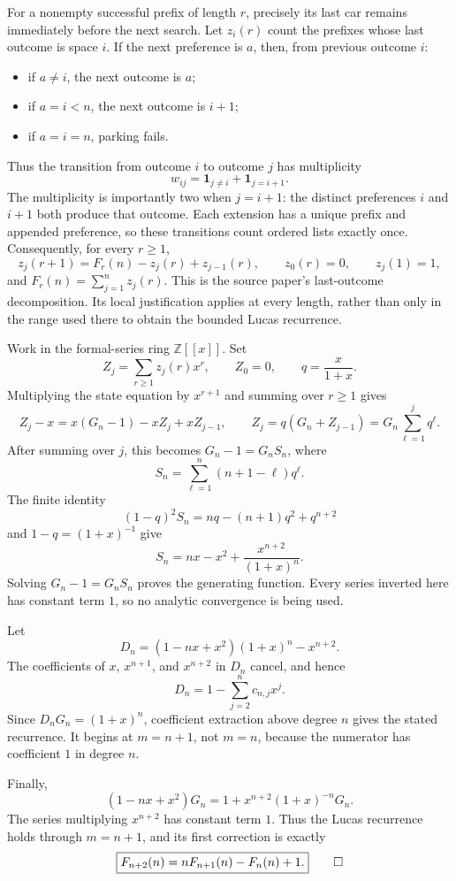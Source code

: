 \documentclass[11pt]{article}
\newcommand{\ind}{\mathbf 1}
\begin{document}
For a nonempty successful prefix of length $r$, precisely its last car remains
immediately before the next search. Let $z_i(r)$ count the prefixes whose last
outcome is space $i$. If the next preference is $a$, then, from previous
outcome $i$:
\begin{itemize}
\item if $a\ne i$, the next outcome is $a$;
\item if $a=i<n$, the next outcome is $i+1$;
\item if $a=i=n$, parking fails.
\end{itemize}
Thus the transition from outcome $i$ to outcome $j$ has multiplicity
\[
 w_{ij}=\ind_{j\ne i}+\ind_{j=i+1}.
\]
The multiplicity is importantly two when $j=i+1$: the distinct preferences
$i$ and $i+1$ both produce that outcome. Each extension has a unique prefix
and appended preference, so these transitions count ordered lists exactly
once. Consequently, for every $r\geq1$,
\[
 z_j(r+1)=F_r(n)-z_j(r)+z_{j-1}(r),\qquad
 z_0(r)=0,\qquad z_j(1)=1,
\]
and $F_r(n)=\sum_{j=1}^n z_j(r)$. This is the source paper's last-outcome
decomposition. Its local justification applies at every length, rather than
only in the range used there to obtain the bounded Lucas recurrence.

Work in the formal-series ring $\mathbb Z[[x]]$. Set
\[
 Z_j=\sum_{r\geq1}z_j(r)x^r,\qquad Z_0=0,\qquad q=\frac{x}{1+x}.
\]
Multiplying the state equation by $x^{r+1}$ and summing over $r\geq1$ gives
\[
 Z_j-x=x(G_n-1)-xZ_j+xZ_{j-1},\qquad
 Z_j=q(G_n+Z_{j-1})=G_n\sum_{\ell=1}^j q^\ell.
\]
After summing over $j$, this becomes $G_n-1=G_nS_n$, where
\[
 S_n=\sum_{\ell=1}^n(n+1-\ell)q^\ell.
\]
The finite identity
\[
 (1-q)^2S_n=nq-(n+1)q^2+q^{n+2}
\]
and $1-q=(1+x)^{-1}$ give
\[
 S_n=nx-x^2+\frac{x^{n+2}}{(1+x)^n}.
\]
Solving $G_n-1=G_nS_n$ proves the generating function. Every series inverted
here has constant term $1$, so no analytic convergence is being used.

Let
\[
 D_n=(1-nx+x^2)(1+x)^n-x^{n+2}.
\]
The coefficients of $x$, $x^{n+1}$, and $x^{n+2}$ in $D_n$ cancel, and hence
\[
 D_n=1-\sum_{j=2}^n c_{n,j}x^j.
\]
Since $D_nG_n=(1+x)^n$, coefficient extraction above degree $n$ gives the
stated recurrence. It begins at $m=n+1$, not $m=n$, because the numerator has
coefficient $1$ in degree $n$.

Finally,
\[
 (1-nx+x^2)G_n=1+x^{n+2}(1+x)^{-n}G_n.
\]
The series multiplying $x^{n+2}$ has constant term $1$. Thus the Lucas
recurrence holds through $m=n+1$, and its first correction is exactly
\[
 \boxed{F_{n+2}(n)=nF_{n+1}(n)-F_n(n)+1.}\qed
\]
\end{document}
